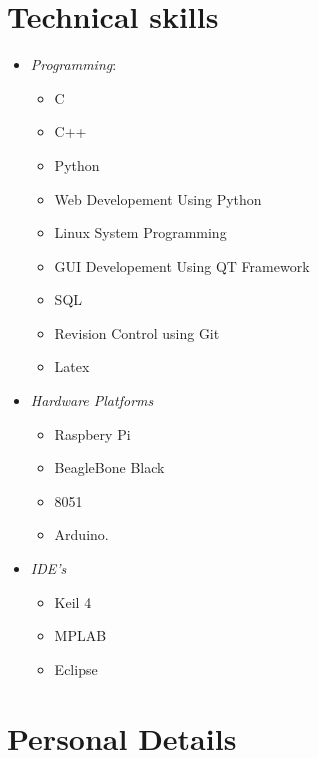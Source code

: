 \documentclass[11pt,a4paper,sans]{moderncv}      	%
\begin{document}
		\section{Technical skills}
		\cvdoubleitem{}
		{
			\begin{itemize}
			\item\textit{Programming}:
				\begin{itemize}
					\item C
					\item C++
					\item Python
					\item Web Developement Using Python
					\item Linux System Programming
					\item GUI Developement Using QT Framework
					\item SQL
					\item Revision Control using Git
					\item Latex
				\end{itemize}
			\end{itemize}
		}{}
		{
			\begin{itemize}
			\item \textit{Hardware Platforms}
				\begin{itemize}
					\item Raspbery Pi				
					\item BeagleBone Black
					\item 8051 
					\item Arduino.
				\end{itemize}
			\item \textit{IDE's}
			\begin{itemize}
			\item Keil 4
				\item MPLAB
				\item Eclipse
				\end{itemize}
			\end{itemize}
		}
		
		
			\section{Personal Details}
			\begin{cvcolumns}
			\end{cvcolumns}
		
\end{document}
